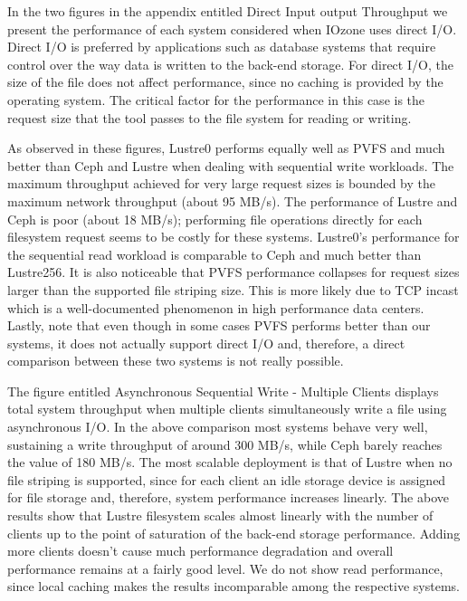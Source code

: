 \documentclass[11pt]{article}
\begin{document}
In the two figures in the appendix entitled Direct Input output Throughput
we present the performance of each system considered when 
IOzone uses direct I/O. Direct I/O is preferred by applications such as 
database systems that require control over the way data is written to the 
back-end storage. For direct I/O, the size of the file does not affect 
performance, since no caching is provided by the operating system. The 
critical factor for the performance in this case is the request size that 
the tool passes to the file system for reading or writing.

As observed in these figures, Lustre0 performs equally well as PVFS and much 
better than Ceph and Lustre when dealing with sequential write workloads. 
The maximum throughput achieved for very large request sizes is bounded 
by the maximum network throughput (about 95 MB/s). The performance of 
Lustre and Ceph is poor (about 18 MB/s); performing file operations 
directly for each filesystem request seems to be costly for these systems. 
Lustre0’s performance for the sequential read workload is comparable to 
Ceph and much better than Lustre256. It is also noticeable that PVFS 
performance collapses for request sizes larger than the supported 
file striping size. This is more likely due to TCP incast which is a 
well-documented phenomenon in high performance data centers. Lastly, 
note that even though in some cases PVFS performs better than our 
systems, it does not actually support direct I/O and, therefore, a 
direct comparison between these two systems is not really possible.

The figure entitled Asynchronous Sequential Write - Multiple Clients 
displays total system throughput when multiple clients 
simultaneously write a file using asynchronous I/O. In the above 
comparison most systems behave very well, sustaining a write throughput 
of around 300 MB/s, while Ceph barely reaches the value of 180 MB/s. 
The most scalable deployment is that of Lustre when no file striping 
is supported, since for each client an idle storage device is assigned 
for file storage and, therefore, system performance increases linearly. 
The above results show that Lustre filesystem scales almost linearly 
with the number of clients up to the point of saturation of the back-end 
storage performance. Adding more clients doesn't cause much performance 
degradation and overall performance remains at a fairly good level. We 
do not show read performance, since local caching makes the results 
incomparable among the respective systems.
\end{document}
